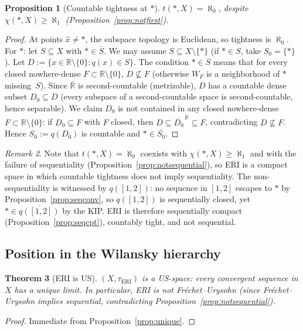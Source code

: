 \documentclass[11pt]{article}
\newtheorem{theorem}{Theorem}[section]
\newtheorem{proposition}[theorem]{Proposition}
\theoremstyle{definition}
\theoremstyle{remark}
\newtheorem{remark}[theorem]{Remark}
\begin{document}
\begin{proposition}[Countable tightness at $\ast$]\label{prop:tightness}
$t(\ast, X) = \aleph_0$, despite
$\chi(\ast, X) \geq \aleph_1$
\textup{(Proposition~\textup{\ref{prop:notfirst}})}.
\end{proposition}
\begin{proof}
At points $\hat{x} \neq \ast$, the subspace topology is Euclidean,
so tightness is $\aleph_0$.
For $\ast$: let $S \subseteq X$ with $\ast \in \overline{S}$.
We may assume $S \subseteq X \setminus \{\ast\}$ (if
$\ast \in S$, take $S_0 = \{\ast\}$).
Let $D := \{x \in \mathbb{R}\setminus\{0\} : q(x) \in S\}$.
The condition $\ast \in \overline{S}$ means that for every closed
nowhere-dense $F \subset \mathbb{R}\setminus\{0\}$,
$D \not\subseteq F$ (otherwise $W_F$ is a neighborhood of $\ast$
missing~$S$).
Since $\overline{\mathbb{R}}$ is second-countable (metrizable), $D$
has a countable dense subset $D_0 \subseteq D$ (every subspace of a
second-countable space is second-countable, hence separable).
We claim $D_0$ is not contained in any closed nowhere-dense
$F \subset \mathbb{R}\setminus\{0\}$:
if $D_0 \subseteq F$ with $F$ closed, then
$D \subseteq \overline{D_0}^{\,\overline{\mathbb{R}}} \subseteq F$,
contradicting $D \not\subseteq F$.
Hence $S_0 := q(D_0)$ is countable and $\ast \in \overline{S_0}$.
\end{proof}

\begin{remark}\label{rem:tightness}
Note that $t(\ast, X) = \aleph_0$ coexists with $\chi(\ast, X) \geq
\aleph_1$ and with the failure of sequentiality
(Proposition~\ref{prop:notsequential}), so ERI is a compact space in
which countable tightness does not imply sequentiality.
The non-sequentiality is witnessed by $q([1, 2])$: no sequence in
$[1, 2]$ escapes to $\ast$ by Proposition~\ref{prop:seqconv}, so
$q([1, 2])$ is sequentially closed, yet $\ast \in \overline{q([1, 2])}$
by the KIP.
ERI is therefore sequentially compact
(Proposition~\ref{prop:seqcpt}), countably tight, and not sequential.
\end{remark}

\subsection{Position in the Wilansky hierarchy}\label{sec:hierarchy}

\begin{theorem}[ERI is US]\label{thm:US}
$(X, \tau_{\mathrm{ERI}})$ is a US-space:
every convergent sequence in $X$ has a unique limit.
In particular, ERI is not Fr\'{e}chet--Urysohn
\textup{(}since Fr\'{e}chet--Urysohn implies sequential,
contradicting Proposition~\textup{\ref{prop:notsequential})}.
\end{theorem}
\begin{proof}
Immediate from Proposition~\ref{prop:unique}.
\end{proof}
\end{document}
